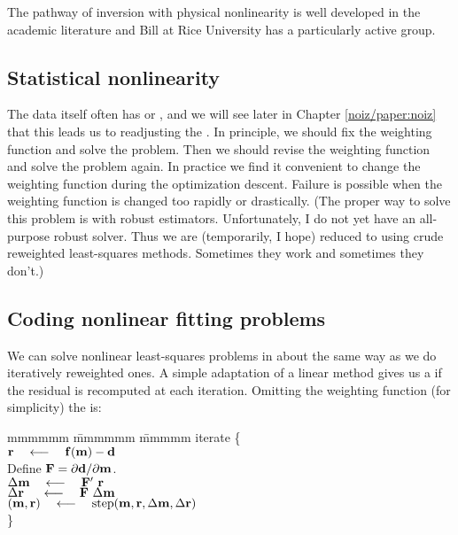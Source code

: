 \par
The pathway of inversion with physical nonlinearity
is well developed in the academic literature
and Bill  at Rice University has a particularly active group.

\subsection{Statistical nonlinearity}
The data itself often has  or , and we will
see later in Chapter \ref{noiz/paper:noiz} that this leads us to
readjusting the .  In principle, we should fix
the weighting function and solve the problem.  Then we should revise
the weighting function and solve the problem again.  In practice we
find it convenient to change the weighting function during the
optimization descent.  Failure is possible when the weighting function
is changed too rapidly or drastically.  (The proper way to solve this
problem is with robust estimators.  Unfortunately, I do not yet have
an all-purpose robust solver.  Thus we are (temporarily, I hope)
reduced to using crude reweighted least-squares methods.  Sometimes
they work and sometimes they don't.)

\subsection{Coding nonlinear fitting problems}
We can solve nonlinear least-squares problems
in about the same way as we do iteratively reweighted ones.
A simple adaptation of a linear method gives us a  if
the residual is recomputed at each iteration.
Omitting the weighting function (for simplicity) the  is:
\begin{tabbing}
mmmmmm \= mmmmmm \= mmmmm \kill
\> {\rm iterate \{ }                                                    \\
\>      \> $\bold r \quad\longleftarrow\quad \bold f( \bold m) - \bold d$       \\
\>      \> Define $\bold F=\partial \bold d/\partial \bold m$.       \\
\>      \>  $\Delta\bold m  \quad\longleftarrow\quad \bold F'\         \bold r$ \\
\>      \>  $\Delta\bold r\ \quad\longleftarrow\quad \bold F \ \Delta \bold m$  \\
\>      \>  $(\bold m,\bold r) \quad\longleftarrow\quad {\rm step}
             (\bold m,\bold r, \Delta\bold m,\Delta\bold r )$ \\
\>      \> \}
\end{tabbing}

